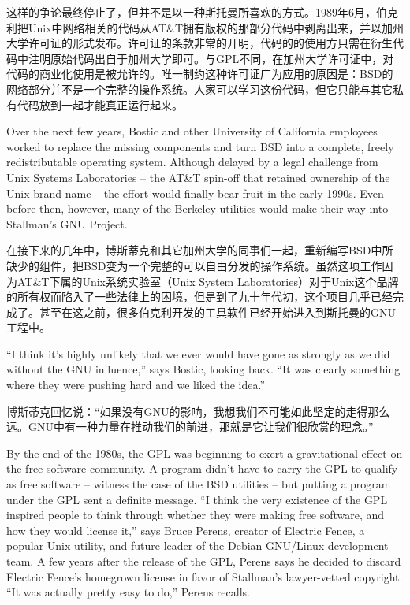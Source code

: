 \ifdefined\chs
这样的争论最终停止了，但并不是以一种斯托曼所喜欢的方式。1989年6月，伯克利把Unix中网络相关的代码从AT\&T拥有版权的那部分代码中剥离出来，并以加州大学许可证的形式发布。许可证的条款非常的开明，代码的的使用方只需在衍生代码中注明原始代码出自于加州大学即可。与GPL不同，在加州大学许可证中，对代码的商业化使用是被允许的。唯一制约这种许可证广为应用的原因是：BSD的网络部分并不是一个完整的操作系统。人家可以学习这份代码，但它只能与其它私有代码放到一起才能真正运行起来。
\fi

\ifdefined\eng
Over the next few years, Bostic and other University of California employees worked to replace the missing components and turn BSD into a complete, freely redistributable operating system. Although delayed by a legal challenge from Unix Systems Laboratories -- the AT\&T spin-off that retained ownership of the Unix brand name -- the effort would finally bear fruit in the early 1990s. Even before then, however, many of the Berkeley utilities would make their way into Stallman's GNU Project.
\fi

\ifdefined\chs
在接下来的几年中，博斯蒂克和其它加州大学的同事们一起，重新编写BSD中所缺少的组件，把BSD变为一个完整的可以自由分发的操作系统。虽然这项工作因为AT\&T下属的Unix系统实验室（Unix System Laboratories）对于Unix这个品牌的所有权而陷入了一些法律上的困境，但是到了九十年代初，这个项目几乎已经完成了。甚至在这之前，很多伯克利开发的工具软件已经开始进入到斯托曼的GNU工程中。
\fi

\ifdefined\eng
``I think it's highly unlikely that we ever would have gone as strongly as we did without the GNU influence,'' says Bostic, looking back. ``It was clearly something where they were pushing hard and we liked the idea.''
\fi

\ifdefined\chs
博斯蒂克回忆说：``如果没有GNU的影响，我想我们不可能如此坚定的走得那么远。GNU中有一种力量在推动我们的前进，那就是它让我们很欣赏的理念。''
\fi

\ifdefined\eng
By the end of the 1980s, the GPL was beginning to exert a gravitational effect on the free software community. A program didn't have to carry the GPL to qualify as free software -- witness the case of the BSD utilities -- but putting a program under the GPL sent a definite message. ``I think the very existence of the GPL inspired people to think through whether they were making free software, and how they would license it,'' says Bruce Perens, creator of Electric Fence, a popular Unix utility, and future leader of the Debian GNU/Linux development team. A few years after the release of the GPL, Perens says he decided to discard Electric Fence's homegrown license in favor of Stallman's lawyer-vetted copyright. ``It was actually pretty easy to do,'' Perens recalls.
\fi

